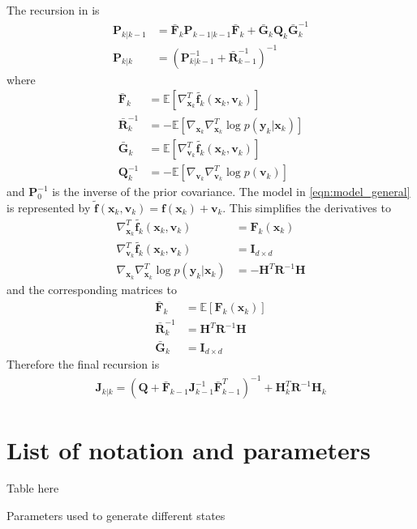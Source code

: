 \documentclass{article}
\renewcommand{\vec}[1]{\ensuremath{{\boldsymbol #1}}}
\newcommand{\mat}[1]{\ensuremath{\boldsymbol{#1}}}
\begin{document}
The recursion in \cite{Bergman2001} is
\begin{subequations}
\begin{align}
	\mat P_{k|k-1} &= \bar{\mat F}_k\mat P_{k-1|k-1}\bar{\mat F}_k + \bar{\mat G}_k\mat Q_k \bar{\mat G}_k^{-1} \\
		\mat P_{k|k} &= \left(\mat P_{k|k-1}^{-1} + \bar{\mat R}_{k-1}^{-1}\right)^{-1}
\end{align}
\end{subequations}
where
\begin{align}
	\bar{\mat F}_k &= \mathbb E \left[ \nabla_{\vec x_k}^T \tilde{\vec f_k}(\vec x_k,\vec v_k)\right] \\
	\bar{\mat R}_k^{-1} &= -\mathbb E\left[ \nabla_{\vec x_k}\nabla_{\vec x_k}^T \log p(\vec y_k|\vec x_k) \right] \\
	\bar{\mat G}_k &= \mathbb E \left[ \nabla_{\vec v_k}^T \tilde{\vec f_k}(\vec x_k,\vec v_k)\right] \\
	\mat Q_k^{-1} &= -\mathbb E \left[ \nabla_{\vec v_k}\nabla_{\vec v_k}^T \log p(\vec v_k) \right]
\end{align}
and $\mat P_0^{-1}$ is the inverse of the prior covariance. The model in \eqref{eqn:model_general} is represented by $\tilde{\vec f}(\vec x_k,\vec v_k) = \vec f(\vec x_k) + \vec v_k$. This simplifies the derivatives to
\begin{align}
	\nabla_{\vec x_k}^T \tilde{\vec f_k}(\vec x_k,\vec v_k) &= \mat F_k(\vec x_k) \\
	\nabla_{\vec v_k}^T \tilde{\vec f_k}(\vec x_k,\vec v_k) &= \mat I_{d\times d} \\
	\nabla_{\vec x_k}\nabla_{\vec x_k}^T \log p(\vec y_k|\vec x_k) &= -\mat H^T\mat R^{-1} \mat H 
\end{align}
and the corresponding matrices to	
\begin{align}
	\bar{\mat F}_k &= \mathbb E\left[ \mat F_k(\vec x_k)\right] \label{eqn:pcrb_term_F}\\
	\bar{\mat R}_k^{-1} &= \mat H^T\mat R^{-1} \mat H \\
	\bar{\mat G}_k &= \mat I_{d\times d} 
\end{align}
Therefore the final recursion is
\begin{align}
	\mat J_{k|k} = \left( \mat Q + \bar{\mat F}_{k-1} \mat J_{k-1}^{-1} \bar{\mat F}_{k-1}^T\right)^{-1} + \mat H_k^T \mat R^{-1} \mat H_k
\end{align}

\section{List of notation and parameters}
\label{sec:parameter_table}

Table here
\begin{table}
	
	\caption{\label{tbl:Parameters}Parameters used to generate different states}
\end{table}

\small


\end{document}

